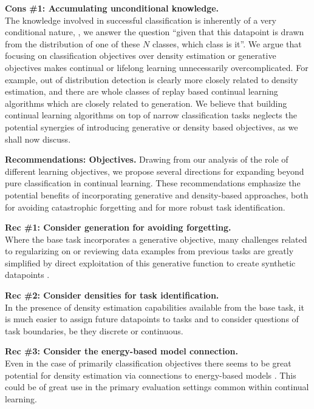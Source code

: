 \textbf{Cons \#1: Accumulating unconditional knowledge.} \\
The knowledge involved in successful classification is inherently of a very conditional nature,
\ie, we answer the question ``given that this datapoint is drawn from the distribution of one of these $N$ classes, which class is it''.
We argue that focusing on classification objectives over density estimation or generative objectives makes continual or lifelong learning unnecessarily overcomplicated.
For example, out of distribution detection is clearly more closely related to density estimation,
and there are whole classes of replay based continual learning algorithms which are closely related to generation.
We believe that building continual learning algorithms on top of narrow classification tasks neglects the potential synergies of introducing generative or density based objectives,
as we shall now discuss.

\begin{tcolorbox}[colback=blue!10,colframe=blue!50,boxsep=-1pt]
\textbf{Recommendations: Objectives.}
Drawing from our analysis of the role of different learning objectives, we propose several 
directions for expanding beyond pure classification in continual learning. These recommendations 
emphasize the potential benefits of incorporating generative and density-based approaches, 
both for avoiding catastrophic forgetting and for more robust task identification.
\end{tcolorbox}

\textbf{Rec \#1: Consider generation for avoiding forgetting.} \\
Where the base task incorporates a generative objective, many challenges related to regularizing on or reviewing data examples from previous tasks are greatly simplified by direct exploitation of this generative function to create synthetic datapoints \cite{Robins95pseudorehearsal}.

\textbf{Rec \#2: Consider densities for task identification.} \\
In the presence of density estimation capabilities available from the base task, it is much easier to assign future datapoints to tasks and to consider questions of task boundaries, be they discrete or continuous.

\textbf{Rec \#3: Consider the energy-based model connection.} \\
Even in the case of primarily classification objectives there seems to be great potential for density estimation via connections to energy-based models \cite{grathwohl2020secretlyenergybased, li2022energybasedforcontinual}.
This could be of great use in the primary evaluation settings common within continual learning.

